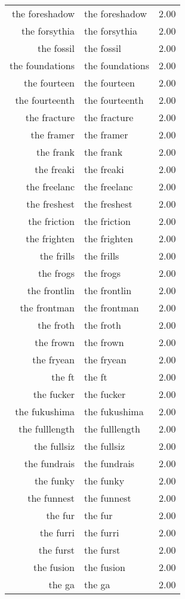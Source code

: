 \begin{table}[ht]
\begin{tabular}{rlr}
  the foreshadow & the foreshadow & 2.00 \\ 
  the forsythia & the forsythia & 2.00 \\ 
  the fossil & the fossil & 2.00 \\ 
  the foundations & the foundations & 2.00 \\ 
  the fourteen & the fourteen & 2.00 \\ 
  the fourteenth & the fourteenth & 2.00 \\ 
  the fracture & the fracture & 2.00 \\ 
  the framer & the framer & 2.00 \\ 
  the frank & the frank & 2.00 \\ 
  the freaki & the freaki & 2.00 \\ 
  the freelanc & the freelanc & 2.00 \\ 
  the freshest & the freshest & 2.00 \\ 
  the friction & the friction & 2.00 \\ 
  the frighten & the frighten & 2.00 \\ 
  the frills & the frills & 2.00 \\ 
  the frogs & the frogs & 2.00 \\ 
  the frontlin & the frontlin & 2.00 \\ 
  the frontman & the frontman & 2.00 \\ 
  the froth & the froth & 2.00 \\ 
  the frown & the frown & 2.00 \\ 
  the fryean & the fryean & 2.00 \\ 
  the ft & the ft & 2.00 \\ 
  the fucker & the fucker & 2.00 \\ 
  the fukushima & the fukushima & 2.00 \\ 
  the fulllength & the fulllength & 2.00 \\ 
  the fullsiz & the fullsiz & 2.00 \\ 
  the fundrais & the fundrais & 2.00 \\ 
  the funky & the funky & 2.00 \\ 
  the funnest & the funnest & 2.00 \\ 
  the fur & the fur & 2.00 \\ 
  the furri & the furri & 2.00 \\ 
  the furst & the furst & 2.00 \\ 
  the fusion & the fusion & 2.00 \\ 
  the ga & the ga & 2.00 \\ 

\end{tabular}
\end{table}
